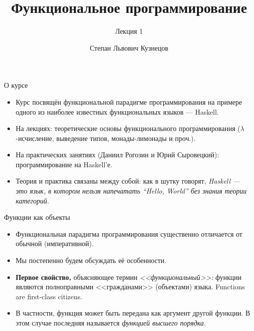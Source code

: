 \documentclass[xcolor=dvipsnames]{beamer}
\begin{document}
\title{Функциональное программирование}
\subtitle{Лекция 1}
\date{}
\author{Степан Львович Кузнецов}

\maketitle

\begin{frame}{О курсе}

\begin{itemize}[<+->]
 \item Курс посвящён функциональной парадигме программирования на примере одного из наиболее известных функциональных языков --- Haskell.
 \item На лекциях: теоретические основы функционального программирования ($\lambda$-исчисление, выведение типов, монады-лимонады и проч.).
 \item На практических занятиях (Даниил Рогозин и Юрий Сыровецкий): программирование на Haskell'е.
 \item Теория и практика связаны между собой: как в шутку говорят, {\em Haskell --- это язык, в котором нельзя напечатать ``Hello, World'' без знания теории категорий.}
\end{itemize}

 
\end{frame}

\begin{frame}{Функции как объекты}

\begin{itemize}[<+->]
 \item Функциональная парадигма программирования существенно отличается от обычной (императивной).
 \item Мы постепенно будем обсуждать её особенности.
 \item {\bf Первое свойство,} объясняющее термин {\em <<функциональный>>:} функции являются полноправными <<гражданами>> (объектами) языка. Functions are first-class citizens.
 \item В частности, функция может быть передана как аргумент другой функции. В этом случае последняя называется {\em функцией высшего порядка.}
\end{itemize}

 
\end{frame}
\end{document}
